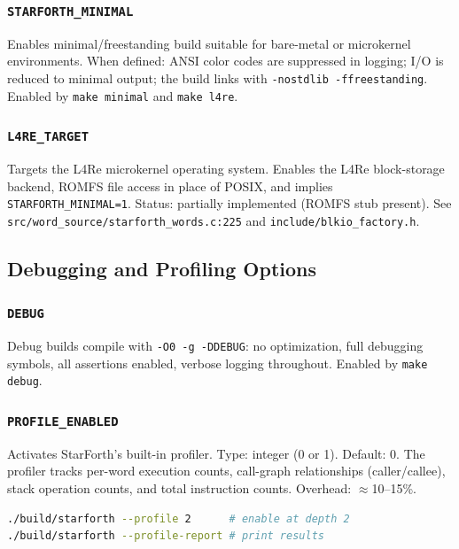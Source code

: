 \subsubsection{\texttt{STARFORTH\_MINIMAL}}

Enables minimal/freestanding build suitable for bare-metal or microkernel
environments. When defined: ANSI color codes are suppressed in logging; I/O
is reduced to minimal output; the build links with \texttt{-nostdlib
-ffreestanding}. Enabled by \texttt{make minimal} and \texttt{make l4re}.

\subsubsection{\texttt{L4RE\_TARGET}}

Targets the L4Re microkernel operating system. Enables the L4Re block-storage
backend, ROMFS file access in place of POSIX, and implies
\texttt{STARFORTH\_MINIMAL=1}. Status: partially implemented (ROMFS stub
present). See \texttt{src/word\_source/starforth\_words.c:225} and
\texttt{include/blkio\_factory.h}.

\subsection{Debugging and Profiling Options}
\label{sec:build-debug}

\subsubsection{\texttt{DEBUG}}

Debug builds compile with \texttt{-O0 -g -DDEBUG}: no optimization, full
debugging symbols, all assertions enabled, verbose logging throughout. Enabled
by \texttt{make debug}.

\subsubsection{\texttt{PROFILE\_ENABLED}}

Activates StarForth's built-in profiler. Type: integer (0 or 1). Default: 0.
The profiler tracks per-word execution counts, call-graph relationships
(caller/callee), stack operation counts, and total instruction counts.
Overhead: \(\approx\)10--15\%.

\begin{lstlisting}[language=bash]
./build/starforth --profile 2      # enable at depth 2
./build/starforth --profile-report # print results
\end{lstlisting}

